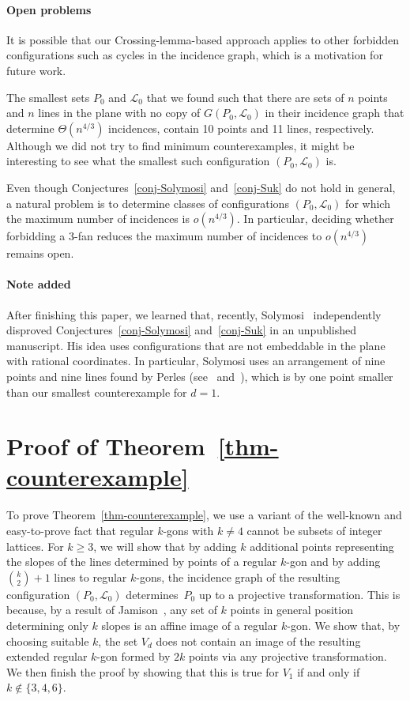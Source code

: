 \documentclass{article}
\begin{document}
 

\paragraph{Open problems}

It is possible that our Crossing-lemma-based approach applies to other forbidden configurations such as cycles in the incidence graph, which is a motivation for future work.


The smallest sets $P_0$ and $\mathcal{L}_0$ that we found such that there are sets of $n$ points and $n$ lines in the plane with no copy of $G(P_0,\mathcal{L}_0)$ in their incidence graph that determine $\Theta(n^{4/3})$ incidences, contain 10 points and 11 lines, respectively.
Although we did not try to find minimum counterexamples, it might be interesting to see what the smallest such configuration $(P_0,\mathcal{L}_0)$ is.

Even though Conjectures~\ref{conj-Solymosi} and~\ref{conj-Suk} do not hold in general, a natural problem is to determine classes of configurations $(P_0,\mathcal{L}_0)$ for which the maximum number of incidences is $o(n^{4/3})$.
In particular, deciding whether forbidding a 3-fan reduces the maximum number of incidences to $o(n^{4/3})$ remains open.

\paragraph{Note added}
After finishing this paper, we learned that, recently, Solymosi~\cite{solymosi} independently disproved Conjectures~\ref{conj-Solymosi} and~\ref{conj-Suk} in an unpublished manuscript.
His idea uses configurations that are not embeddable in the plane with rational coordinates.
In particular, Solymosi uses an arrangement of nine points and nine lines found by Perles (see~\cite{ziegler08} and~\cite{grun03}), which is by one point smaller than our smallest counterexample for $d=1$.



\section{Proof of Theorem~\ref{thm-counterexample}}
\label{sec-gon}

To prove Theorem~\ref{thm-counterexample}, we use a variant of the well-known and easy-to-prove fact that regular $k$-gons with $k \neq 4$ cannot be subsets of integer lattices.
For $k \geq 3$, we will show that by adding $k$ additional points representing the slopes of the lines determined by points of a regular $k$-gon and by adding $\binom{k}{2}+1$ lines to regular $k$-gons, the incidence graph of the resulting configuration $(P_0,\mathcal{L}_0)$ determines~$P_0$ up to a projective transformation.
This is because, by a result of Jamison~\cite{jamison86}, any set of $k$ points in general position determining only $k$ slopes is an affine image of a regular $k$-gon.
We show that, by choosing suitable $k$, the set $V_d$ does not contain an image of the resulting extended regular $k$-gon formed by $2k$ points via any projective transformation.
We then finish the proof by showing that this is true for $V_1$ if and only if $k \notin \{3,4,6\}$.
\end{document}
